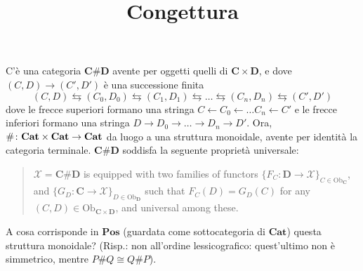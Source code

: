 \documentclass{article}
\title{Congettura}
\def\C{\mathbf{C}}
\def\D{\mathbf{D}}
\begin{document}
\maketitle
C'\`e una categoria $\C\#\D$ avente per oggetti quelli di $\C \times \D$, e dove $(C,D)\to (C', D')$ è una successione finita
\[
(C,D) \leftrightarrows (C_0,D_0) \leftrightarrows (C_1,D_1)\leftrightarrows \dots \leftrightarrows (C_n,D_n)\leftrightarrows (C', D')
\]
dove le frecce superiori formano una stringa $C\leftarrow C_0\leftarrow \dots C_n \leftarrow C'$ e le frecce inferiori formano una stringa $D \to D_0 \to \dots \to D_n \to D'$. Ora, $\# \colon \textbf{Cat}\times\textbf{Cat} \to\bf Cat$ da luogo a una struttura monoidale, avente per identità la categoria terminale. $\C\#\D$ soddisfa la seguente proprietà universale:
\begin{quote}
$\mathcal{X}=\C\#\D$ is equipped with two families of functors $\{F_C\colon \D\to \mathcal X\}_{C\in\mathrm{Ob}_\C}$, and $\{G_D\colon \C\to \mathcal X\}_{D\in \mathrm{Ob}_{\D}}$ such that $F_C(D)=G_D(C)$ for any $(C,D)\in \mathrm{Ob}_{\C\times\D}$, and universal among these.
\end{quote}
A cosa corrisponde in $\textbf{Pos}$ (guardata come sottocategoria di $\mathbf{Cat}$) questa struttura monoidale? (Risp.: non all'ordine lessicografico: quest'ultimo non \`e simmetrico, mentre $P\# Q\cong Q\# P$).
\end{document}
